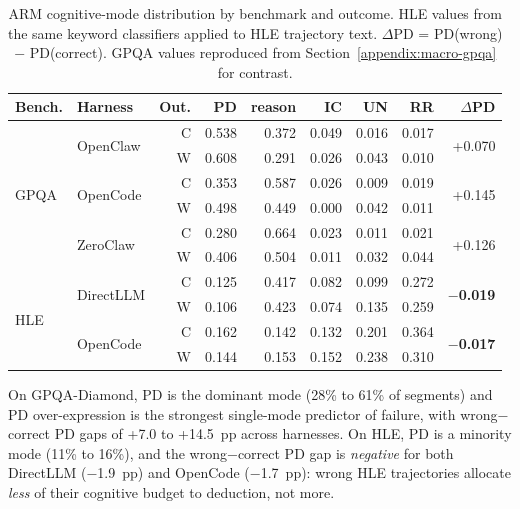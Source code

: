 \begin{table}[t]
\centering
\small
\caption{%
  ARM cognitive-mode distribution by benchmark and outcome.
  HLE values from the same keyword classifiers applied to HLE trajectory text.
  $\Delta$PD = PD(wrong) $-$ PD(correct).
  GPQA values reproduced from Section~\ref{appendix:macro-gpqa} for contrast.
}
\label{tab:hle-arm-modes}
\setlength{\tabcolsep}{2.5pt}
\begin{tabular}{llrrrrrrr}
\toprule
Bench. & Harness & Out. & PD & reason & IC & UN & RR & $\Delta$PD \\
\midrule
\multirow{6}{*}{GPQA}
& \multirow{2}{*}{OpenClaw}
  & C & 0.538 & 0.372 & 0.049 & 0.016 & 0.017 & \multirow{2}{*}{+0.070} \\
& & W & 0.608 & 0.291 & 0.026 & 0.043 & 0.010 & \\
\cmidrule{2-8}
& \multirow{2}{*}{OpenCode}
  & C & 0.353 & 0.587 & 0.026 & 0.009 & 0.019 & \multirow{2}{*}{+0.145} \\
& & W & 0.498 & 0.449 & 0.000 & 0.042 & 0.011 & \\
\cmidrule{2-8}
& \multirow{2}{*}{ZeroClaw}
  & C & 0.280 & 0.664 & 0.023 & 0.011 & 0.021 & \multirow{2}{*}{+0.126} \\
& & W & 0.406 & 0.504 & 0.011 & 0.032 & 0.044 & \\
\midrule
\multirow{4}{*}{HLE}
& \multirow{2}{*}{DirectLLM}
  & C & 0.125 & 0.417 & 0.082 & 0.099 & 0.272 & \multirow{2}{*}{\textbf{$-$0.019}} \\
& & W & 0.106 & 0.423 & 0.074 & 0.135 & 0.259 & \\
\cmidrule{2-8}
& \multirow{2}{*}{OpenCode}
  & C & 0.162 & 0.142 & 0.132 & 0.201 & 0.364 & \multirow{2}{*}{\textbf{$-$0.017}} \\
& & W & 0.144 & 0.153 & 0.152 & 0.238 & 0.310 & \\
\bottomrule
\end{tabular}
\end{table}


On GPQA-Diamond, PD is the dominant mode (28\% to 61\% of segments) and PD
over-expression is the strongest single-mode predictor of failure, with
wrong$-$correct PD gaps of +7.0 to +14.5~pp across harnesses.
On HLE, PD is a minority mode (11\% to 16\%), and the wrong$-$correct PD gap
is \emph{negative} for both DirectLLM ($-$1.9~pp) and OpenCode ($-$1.7~pp):
wrong HLE trajectories allocate \emph{less} of their cognitive budget to
deduction, not more.

